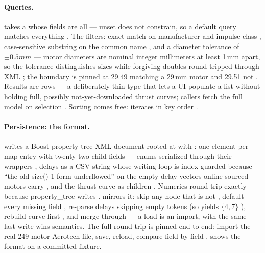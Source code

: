 \paragraph{Queries.}  takes a  whose fields are all
 --- unset does not constrain, so a default query matches everything
. The filters: exact match on manufacturer and
impulse class , case-sensitive substring on the
common name , and a diameter tolerance of
$\pm 0.5\unit{mm}$ --- motor diameters are nominal integer millimeters at least 1\,mm
apart, so the tolerance distinguishes sizes while forgiving doubles round-tripped
through XML ; the boundary is pinned at 29.49
matching a 29\,mm motor and 29.51 not .
Results are  rows --- a deliberately thin type that lets a UI populate
a list without holding full, possibly not-yet-downloaded thrust curves; callers fetch the
full model on selection . Sorting comes free:
 iterates in key order .

\paragraph{Persistence: the  format.}  writes a Boost
property-tree XML document rooted at  with
 : one  element
per map entry with twenty-two child fields --- enums serialized through their 
wrappers , delays as a CSV string whose writing
loop is index-guarded because ``the old size()-1 form underflowed'' on the empty delay
vectors online-sourced motors carry , and the
thrust curve as  children
. Numerics round-trip exactly because
property\_tree writes 
.  mirrors it:
skip any node that is not  , default
every missing field , re-parse delays skipping
empty tokens (so  yields $\{4,7\}$
), rebuild curve-first
, and merge through 
 --- a load is an import, with the same
last-write-wins semantics. The full round trip is pinned end to end: import the real
249-motor Aerotech file, save, reload, compare field by field
.  shows the
format on a committed fixture.

